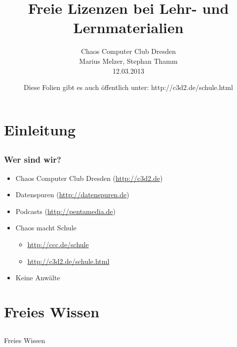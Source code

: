 \documentclass[table]{beamer}
\title{Freie Lizenzen bei Lehr- und Lernmaterialien}
\author{Chaos Computer Club Dresden\\Marius Melzer, Stephan Thamm\\12.03.2013}
\date{Diese Folien gibt es auch öffentlich unter: http://c3d2.de/schule.html}
\begin{document}
\maketitle


\section{Einleitung}
\subsection{}

\begin{frame}
    \frametitle{Wer sind wir?}
    \begin{itemize}
        \item<2-> Chaos Computer Club Dresden (\url{http://c3d2.de})
            \note{}
        \item<3-> Datenspuren (\url{http://datenspuren.de})
        \item<4-> Podcasts (\url{http://pentamedia.de})
        \item<5-> Chaos macht Schule
            \begin{itemize}
                \item<2-> \url{http://ccc.de/schule}
                \item<2-> \url{http://c3d2.de/schule.html}
            \end{itemize}
        \item<6-> Keine Anwälte
    \end{itemize}
\end{frame}

\section{Freies Wissen}
\subsection{}

\begin{frame}
    \begin{center}\Large
    Freies Wissen
    \end {center}
\end{frame}
\end{document}
